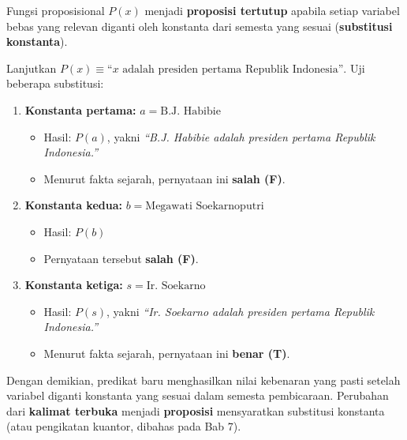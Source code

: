 Fungsi proposisional $P(x)$ menjadi \textbf{proposisi tertutup} apabila setiap variabel bebas yang relevan diganti oleh konstanta dari semesta yang sesuai (\textbf{substitusi konstanta}).

\begin{contoh}
Lanjutkan $P(x) \equiv \text{``}x \text{ adalah presiden pertama Republik Indonesia''}$. Uji beberapa substitusi:

\begin{enumerate}
    \item \textbf{Konstanta pertama:} $a = \text{B.J. Habibie}$
    \begin{itemize}
        \item Hasil: $P(a)$, yakni \textit{``B.J. Habibie adalah presiden pertama Republik Indonesia.''}
        \item Menurut fakta sejarah, pernyataan ini \textbf{salah (F)}.
    \end{itemize}

    \item \textbf{Konstanta kedua:} $b = \text{Megawati Soekarnoputri}$
    \begin{itemize}
        \item Hasil: $P(b)$
        \item Pernyataan tersebut \textbf{salah (F)}.
    \end{itemize}

    \item \textbf{Konstanta ketiga:} $s = \text{Ir. Soekarno}$
    \begin{itemize}
        \item Hasil: $P(s)$, yakni \textit{``Ir. Soekarno adalah presiden pertama Republik Indonesia.''}
        \item Menurut fakta sejarah, pernyataan ini \textbf{benar (T)}.
    \end{itemize}
\end{enumerate}
\end{contoh}

Dengan demikian, predikat baru menghasilkan nilai kebenaran yang pasti setelah variabel diganti konstanta yang sesuai dalam semesta pembicaraan. Perubahan dari \textbf{kalimat terbuka} menjadi \textbf{proposisi} mensyaratkan substitusi konstanta (atau pengikatan kuantor, dibahas pada Bab 7).
